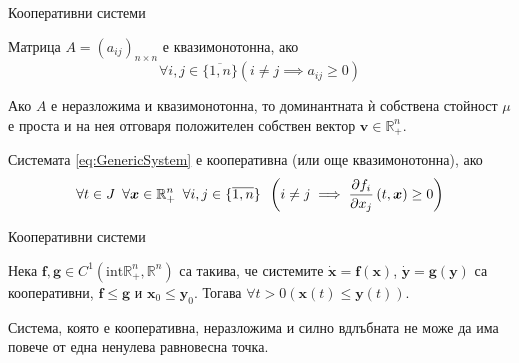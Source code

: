 \begin{frame}[t]{Кооперативни системи}
  \begin{definition}
    Матрица $A=(a_{ij})_{n \times n}$ е квазимонотонна, ако
    \begin{equation*}
      \forall{i,j \in \{\overline{1,n}\}} \left(i \neq j \implies a_{ij} \geq 0\right)
    \end{equation*}
  \end{definition}

  \begin{theorem}
    Ако $A$ е неразложима и квазимонотонна, то доминантната ѝ собствена стойност $\mu$ е проста и на нея отговаря положителен собствен вектор $\boldsymbol{v} \in \mathbb{R}_{+}^n$.
  \end{theorem}

  \begin{definition}
    \label{def:Cooperative}
    Системата \eqref{eq:GenericSystem} е кооперативна (или още квазимонотонна), ако
    \begin{equation}
      \forall{t \in J} \hspace{0.5em} \forall{\boldsymbol{x} \in \mathbb{R}_{+}^n} \hspace{0.5em} \forall{i,j \in \{\overline{1,n}\}} \hspace{0.5em} \left(i \neq j \implies \pdv{f_i}{x_j}\left(t, \boldsymbol{x}\right) \geq 0\right)
    \end{equation}
  \end{definition}

\end{frame}

\begin{frame}[t]{Кооперативни системи}
  \begin{theorem}
    \label{thm:Comparison}
    Нека $\boldsymbol{f}, \boldsymbol{g} \in C^1(\mathrm{int} \mathbb{R}_{+}^n, \mathbb{R}^n)$ са такива, че системите $\dot{\boldsymbol{x}}=\boldsymbol{f}(\boldsymbol{x})$, $\dot{\boldsymbol{y}}=\boldsymbol{g}(\boldsymbol{y})$ са кооперативни, $\boldsymbol{f} \leq \boldsymbol{g}$ и $\boldsymbol{x}_0 \leq \boldsymbol{y}_0$. Тогава $\forall{t>0}(\boldsymbol{x}(t) \leq \boldsymbol{y}(t))$.
  \end{theorem}

  \begin{theorem}
    Система, която е кооперативна, неразложима и силно вдлъбната не може да има повече от една ненулева равновесна точка.
  \end{theorem}
\end{frame}
